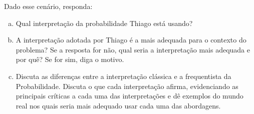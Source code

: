 \documentclass[12pt]{article}
\begin{document}
Dado esse cenário, responda:

\begin{enumerate}[a)]
    \item Qual interpretação da probabilidade Thiago está usando? 
    \item A interpretação adotada por Thiago é a mais adequada para o contexto do problema? Se a resposta for não, qual seria a interpretação mais adequada e por quê? Se for sim, diga o motivo. 
    \item Discuta as diferenças entre a interpretação clássica e a frequentista da Probabilidade. 
    Discuta o que cada interpretação afirma, evidenciando as principais críticas a cada uma das interpretações e dê exemplos do mundo real nos quais seria mais adequado usar cada uma das abordagens. 
\end{enumerate}  
\end{document}

